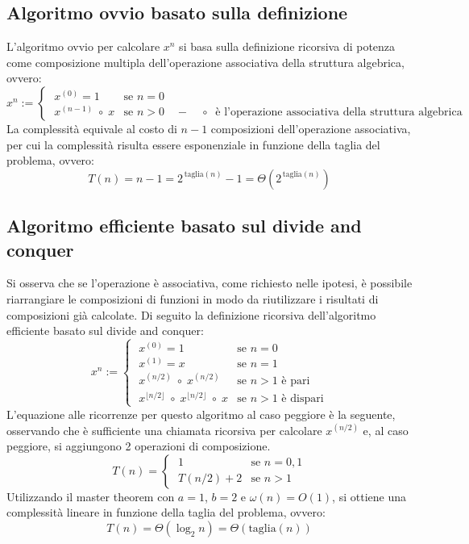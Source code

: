 \subsection{Algoritmo ovvio basato sulla definizione}
L'algoritmo ovvio per calcolare \(x^n\) si basa sulla definizione ricorsiva di potenza come composizione multipla
dell'operazione associativa della struttura algebrica, ovvero:
\[x^n := \begin{cases}
	\; x^{(0)} = 1 & \text{se } n = 0 \\[3pt]
	\; x^{(n-1)} \; \circ \; x & \text{se } n > 0 \quad - \quad \circ \;\; \text{è l'operazione associativa della struttura algebrica}
\end{cases}\]
La complessità equivale al costo di \(n - 1\) composizioni dell'operazione associativa, per cui la complessità risulta
essere esponenziale in funzione della taglia del problema, ovvero:
\[T(n) = n - 1 = 2^{\, \text{taglia}(n)} - 1 = \Theta \left( 2^{\, \text{taglia}(n)} \right)\]

\subsection{Algoritmo efficiente basato sul divide and conquer}
Si osserva che se l'operazione è associativa, come richiesto nelle ipotesi, è possibile riarrangiare le composizioni
di funzioni in modo da riutilizzare i risultati di composizioni già calcolate. Di seguito la definizione ricorsiva
dell'algoritmo efficiente basato sul divide and conquer:
\[x^n := \begin{cases}
	\; x^{(0)} = 1 & \text{se } n = 0 \\[3pt]
	\; x^{(1)} = x & \text{se } n = 1 \\[3pt]
	\; x^{(n/2)} \; \circ \; x^{(n/2)} & \text{se } n > 1 \text{ è pari} \\[3pt]
	\; x^{\lfloor n/2 \rfloor} \; \circ \; x^{\lfloor n/2 \rfloor} \; \circ \; x & \text{se } n > 1 \text{ è dispari}
\end{cases}\]
L'equazione alle ricorrenze per questo algoritmo al caso peggiore è la seguente, osservando che è sufficiente una chiamata
ricorsiva per calcolare \(x^{(n/2)}\) e, al caso peggiore, si aggiungono 2 operazioni di composizione.
\[T(n) = \begin{cases}
	\; 1 & \text{se } n = 0, 1 \\[3pt]
	\; T(n/2) + 2 & \text{se } n > 1
\end{cases}\]
Utilizzando il master theorem con \(a = 1\), \(b = 2\) e \(\omega(n) = O(1)\), si ottiene una complessità lineare
in funzione della taglia del problema, ovvero:
\[T(n) = \Theta \left( \log_2 n \right) = \Theta \left( \text{taglia}(n) \right)\]

